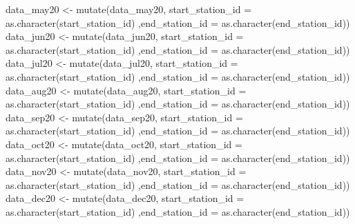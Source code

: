 \documentclass[
]{article}
\newenvironment{Shaded}{\begin{snugshade}}{\end{snugshade}}
\newcommand{\AttributeTok}[1]{\textcolor[rgb]{0.77,0.63,0.00}{#1}}
\newcommand{\FunctionTok}[1]{\textcolor[rgb]{0.00,0.00,0.00}{#1}}
\newcommand{\NormalTok}[1]{#1}
\newcommand{\OtherTok}[1]{\textcolor[rgb]{0.56,0.35,0.01}{#1}}
\begin{document}
\begin{Shaded}
\begin{Highlighting}[]
\NormalTok{data\_may20 }\OtherTok{\textless{}{-}}  \FunctionTok{mutate}\NormalTok{(data\_may20, }\AttributeTok{start\_station\_id =} \FunctionTok{as.character}\NormalTok{(start\_station\_id)}
\NormalTok{                      ,}\AttributeTok{end\_station\_id =} \FunctionTok{as.character}\NormalTok{(end\_station\_id)) }
\NormalTok{data\_jun20 }\OtherTok{\textless{}{-}}  \FunctionTok{mutate}\NormalTok{(data\_jun20, }\AttributeTok{start\_station\_id =} \FunctionTok{as.character}\NormalTok{(start\_station\_id)}
\NormalTok{                      ,}\AttributeTok{end\_station\_id =} \FunctionTok{as.character}\NormalTok{(end\_station\_id)) }
\NormalTok{data\_jul20 }\OtherTok{\textless{}{-}}  \FunctionTok{mutate}\NormalTok{(data\_jul20, }\AttributeTok{start\_station\_id =} \FunctionTok{as.character}\NormalTok{(start\_station\_id)}
\NormalTok{                      ,}\AttributeTok{end\_station\_id =} \FunctionTok{as.character}\NormalTok{(end\_station\_id)) }
\NormalTok{data\_aug20 }\OtherTok{\textless{}{-}}  \FunctionTok{mutate}\NormalTok{(data\_aug20, }\AttributeTok{start\_station\_id =} \FunctionTok{as.character}\NormalTok{(start\_station\_id)}
\NormalTok{                      ,}\AttributeTok{end\_station\_id =} \FunctionTok{as.character}\NormalTok{(end\_station\_id)) }
\NormalTok{data\_sep20 }\OtherTok{\textless{}{-}}  \FunctionTok{mutate}\NormalTok{(data\_sep20, }\AttributeTok{start\_station\_id =} \FunctionTok{as.character}\NormalTok{(start\_station\_id)}
\NormalTok{                      ,}\AttributeTok{end\_station\_id =} \FunctionTok{as.character}\NormalTok{(end\_station\_id)) }
\NormalTok{data\_oct20 }\OtherTok{\textless{}{-}}  \FunctionTok{mutate}\NormalTok{(data\_oct20, }\AttributeTok{start\_station\_id =} \FunctionTok{as.character}\NormalTok{(start\_station\_id)}
\NormalTok{                      ,}\AttributeTok{end\_station\_id =} \FunctionTok{as.character}\NormalTok{(end\_station\_id))}
\NormalTok{data\_nov20 }\OtherTok{\textless{}{-}}  \FunctionTok{mutate}\NormalTok{(data\_nov20, }\AttributeTok{start\_station\_id =} \FunctionTok{as.character}\NormalTok{(start\_station\_id)}
\NormalTok{                      ,}\AttributeTok{end\_station\_id =} \FunctionTok{as.character}\NormalTok{(end\_station\_id)) }
\NormalTok{data\_dec20 }\OtherTok{\textless{}{-}}  \FunctionTok{mutate}\NormalTok{(data\_dec20, }\AttributeTok{start\_station\_id =} \FunctionTok{as.character}\NormalTok{(start\_station\_id)}
\NormalTok{                      ,}\AttributeTok{end\_station\_id =} \FunctionTok{as.character}\NormalTok{(end\_station\_id)) }

\end{Highlighting}
\end{Shaded}
\end{document}
